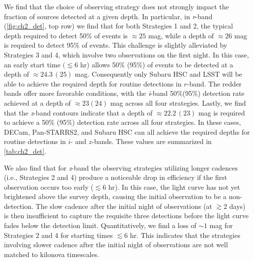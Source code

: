 We find that the choice of observing strategy does not strongly impact the fraction of sources detected at a given depth. In particular, in {\em r}-band (\autoref{fig:ch2_det}, top row) we find that for both Strategies 1 and 2, the typical depth required to detect 50\% of events is $\approx25$ mag, while a depth of $\approx26$ mag is required to detect 95\% of events. This challenge is slightly alleviated by Strategies 3 and 4, which involve two observations on the first night. In this case, an early start time $(\lesssim 6$ hr) allows 50\% (95\%) of events to be detected at a depth of $\approx24.3\,(25)$ mag. Consequently only Subaru HSC and LSST will be able to achieve the required depth for routine detections in $r$-band. The redder bands offer more favorable conditions, with the {\em i}-band 50\%(95\%) detection rate achieved at a depth of $\approx 23(24)$ mag across all four strategies. Lastly, we find that the {\em z}-band contours indicate that a depth of $\approx22.2\,(23)$ mag is required to achieve a 50\% (95\%) detection rate across all four strategies. In these cases, DECam, Pan-STARRS2, and Subaru HSC can all achieve the required depths for routine detections in $i$- and $z$-bands.  These values are summarized in \autoref{tab:ch2_det}.

We also find that for {\em z}-band the observing strategies utilizing longer cadences (i.e., Strategies 2 and 4) produce a noticeable drop in efficiency if the first observation occurs too early ($\lesssim 6$ hr). In this case, the light curve has not yet brightened above the survey depth, causing the initial observation to be a non-detection. The slow cadence after the initial night of observations (at $\gtrsim2$ days) is then insufficient to capture the requisite three detections before the light curve fades below the detection limit. Quantitatively, we find a loss of $\sim 1$ mag for Strategies 2 and 4 for starting times $\lesssim 6$ hr. This indicates that the strategies involving slower cadence after the initial night of observations are not well matched to kilonova timescales.

